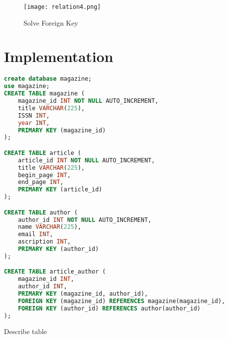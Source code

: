 \documentclass[12pt]{article}
\begin{document}
\begin{figure}[H]
  \texttt{[image: relation4.png]}
  \caption{Solve Foreign Key}
  \label{fig:relation4}
\end{figure}
\section{Implementation}
\begin{lstlisting}[language=SQL]
create database magazine;
use magazine;
CREATE TABLE magazine (
	magazine_id INT NOT NULL AUTO_INCREMENT,
	title VARCHAR(225),
	ISSN INT,
	year INT,
	PRIMARY KEY (magazine_id)
);

CREATE TABLE article (
	article_id INT NOT NULL AUTO_INCREMENT,
	title VARCHAR(225),
	begin_page INT,
	end_page INT,
	PRIMARY KEY (article_id)
);

CREATE TABLE author (
	author_id INT NOT NULL AUTO_INCREMENT,
	name VARCHAR(225),
	email INT,
	ascription INT,
	PRIMARY KEY (author_id)
);

CREATE TABLE article_author (
	magazine_id INT,
	author_id INT,
	PRIMARY KEY (magazine_id, author_id),
	FOREIGN KEY (magazine_id) REFERENCES magazine(magazine_id),
	FOREIGN KEY (author_id) REFERENCES author(author_id)
);
\end{lstlisting}
Describe table
\end{document}
